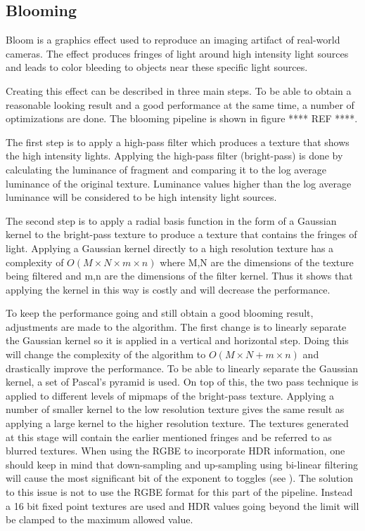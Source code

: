 \documentclass[twocolumn,8pt]{article}
\begin{document}
\subsection{Blooming}
Bloom is a graphics effect used to reproduce an imaging artifact of real-world cameras. The effect produces fringes of light around high intensity light sources and leads to color bleeding to objects near these specific light sources. 

Creating this effect can be described in three main steps. To be able to obtain a reasonable looking result and a good performance at the same time, a number of optimizations are done.  The blooming pipeline is shown in figure **** REF ****.

The first step is to apply a high-pass filter which produces a texture that shows the high intensity lights. Applying the high-pass filter (bright-pass) is done by calculating the luminance of fragment and comparing it to the log average luminance of the original texture. Luminance values higher than the log average luminance will be considered to be high intensity light sources.

The second step is to apply a radial basis function in the form of a Gaussian kernel to the bright-pass texture to produce a texture that contains the fringes of light. Applying a Gaussian kernel directly to a high resolution texture has a complexity of $O \left ( M \times N \times m \times n  \right )$ where M,N are the dimensions of the texture being filtered and m,n are the dimensions of the filter kernel. Thus it shows that applying the kernel in this way is costly and will decrease the performance. 

To keep the performance going and still obtain a good blooming result, adjustments are made to the algorithm. The first change is to linearly separate the Gaussian kernel so it is applied in a vertical and horizontal step. Doing this will change the complexity of the algorithm to $O \left ( M \times N + m \times n  \right )$ and drastically improve the performance. To be able to linearly separate the Gaussian kernel, a set of Pascal's pyramid is used. On top of this, the two pass technique is applied to different levels of mipmaps of the bright-pass texture. Applying a number of smaller kernel to the low resolution texture gives the same result as applying a large kernel to the higher resolution texture. The textures generated at this stage will contain the earlier mentioned fringes and be referred to as blurred textures. When using the RGBE to incorporate HDR information, one should keep in mind that down-sampling and up-sampling using bi-linear filtering will cause the most significant bit of the exponent to toggles (see \cite{hdrTexturing}). The solution to this issue is not to use the RGBE format for this part of the pipeline. Instead a 16 bit fixed point textures are used and HDR values going beyond the limit will be clamped to the maximum allowed value.
\end{document}
